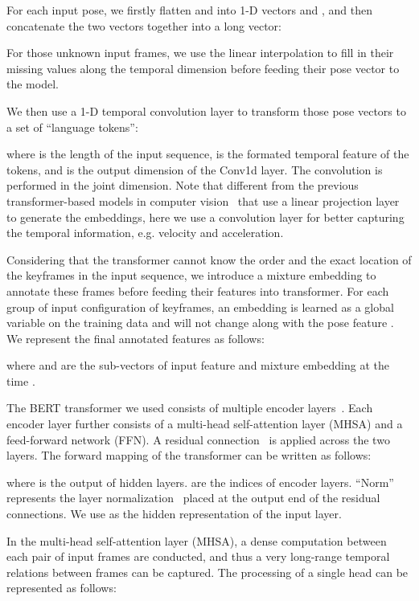 \documentclass[10pt,twocolumn,letterpaper]{article}
\begin{document}
For each input pose, we firstly flatten  and  into 1-D vectors  and , and then concatenate the two vectors together into a long vector:

For those unknown input frames, we use the linear interpolation to fill in their missing values along the temporal dimension before feeding their pose vector to the model.

We then use a 1-D temporal convolution layer to transform those pose vectors to a set of ``language tokens'':

where  is the length of the input sequence,  is the formated temporal feature of the tokens, and  is the output dimension of the Conv1d layer. The convolution is performed in the joint dimension. Note that different from the previous transformer-based models in computer vision~\cite{dosovitskiy2020VIT} that use a linear projection layer to generate the embeddings, here we use a convolution layer for better capturing the temporal information, e.g. velocity and acceleration.

Considering that the transformer cannot know the order and the exact location of the keyframes in the input sequence, we introduce a mixture embedding  to annotate these frames before feeding their features into transformer. For each group of input configuration of keyframes, an embedding  is learned as a global variable on the training data and will not change along with the pose feature . We represent the final annotated features  as follows:

where  and  are the sub-vectors of input feature  and mixture embedding  at the time .

The BERT transformer we used consists of multiple encoder layers~\cite{devlin2018bert}. Each encoder layer further consists of a multi-head self-attention layer (MHSA) and a feed-forward network (FFN). A residual connection~\cite{he2016resnet} is applied across the two layers. The forward mapping of the transformer can be written as follows:

where  is the output of hidden layers.  are the indices of encoder layers. ``Norm'' represents the layer normalization~\cite{ba2016layer} placed at the output end of the residual connections. We use  as the hidden representation of the input layer.

In the multi-head self-attention layer (MHSA), a dense computation between each pair of input frames are conducted, and thus a very long-range temporal relations between frames can be captured. The processing of a single head can be represented as follows: 
\end{document}
